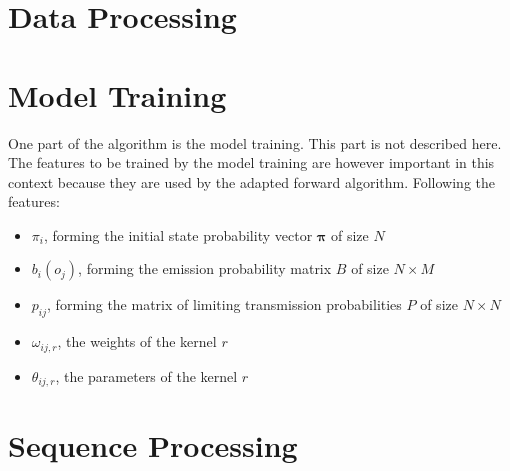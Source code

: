 \documentclass[mscthesis]{usiinfthesis}
\begin{document}
\section{Data Processing}
\label{ch:event_data}

\section{Model Training}
\label{ch:event_train}

One part of the algorithm is the model training. This part is not described
here. The features to be trained by the model training are however important
in this context because they are used by the adapted forward algorithm.
Following the features:
\begin{itemize}
    \item $ \pi_i $, forming the initial state probability vector
        $ \boldsymbol{\pi} $ of size $ N $
    \item $ b_i(o_j) $, forming the emission probability matrix $ B $ of size
        $ N \times M $
    \item $ p_{ij} $, forming the matrix of limiting transmission probabilities
        $ P $ of size $ N \times N $
    \item $ \omega_{ij, r} $, the weights of the kernel $ r $
    \item $ \theta_{ij, r} $, the parameters of the kernel $ r $
\end{itemize}

\section{Sequence Processing}
\label{ch:event_sequ}
\end{document}
